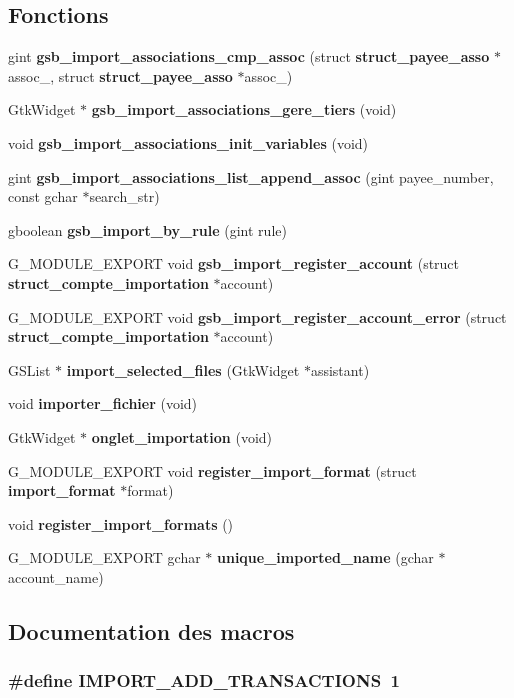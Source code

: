 \subsection*{Fonctions}
\begin{DoxyCompactItemize}
\item 
gint {\bf gsb\_\-import\_\-associations\_\-cmp\_\-assoc} (struct {\bf struct\_\-payee\_\-asso} $\ast$assoc\_, struct {\bf struct\_\-payee\_\-asso} $\ast$assoc\_)
\item 
GtkWidget $\ast$ {\bf gsb\_\-import\_\-associations\_\-gere\_\-tiers} (void)
\item 
void {\bf gsb\_\-import\_\-associations\_\-init\_\-variables} (void)
\item 
gint {\bf gsb\_\-import\_\-associations\_\-list\_\-append\_\-assoc} (gint payee\_\-number, const gchar $\ast$search\_\-str)
\item 
gboolean {\bf gsb\_\-import\_\-by\_\-rule} (gint rule)
\item 
G\_\-MODULE\_\-EXPORT void {\bf gsb\_\-import\_\-register\_\-account} (struct {\bf struct\_\-compte\_\-importation} $\ast$account)
\item 
G\_\-MODULE\_\-EXPORT void {\bf gsb\_\-import\_\-register\_\-account\_\-error} (struct {\bf struct\_\-compte\_\-importation} $\ast$account)
\item 
GSList $\ast$ {\bf import\_\-selected\_\-files} (GtkWidget $\ast$assistant)
\item 
void {\bf importer\_\-fichier} (void)
\item 
GtkWidget $\ast$ {\bf onglet\_\-importation} (void)
\item 
G\_\-MODULE\_\-EXPORT void {\bf register\_\-import\_\-format} (struct {\bf import\_\-format} $\ast$format)
\item 
void {\bf register\_\-import\_\-formats} ()
\item 
G\_\-MODULE\_\-EXPORT gchar $\ast$ {\bf unique\_\-imported\_\-name} (gchar $\ast$account\_\-name)
\end{DoxyCompactItemize}


\subsection{Documentation des macros}
\subsubsection[{IMPORT\_\-ADD\_\-TRANSACTIONS}]{\setlength{\rightskip}{0pt plus 5cm}\#define IMPORT\_\-ADD\_\-TRANSACTIONS~1}\label{import_8h_ab305602f6b5404b42e8d2789aaff3885}


